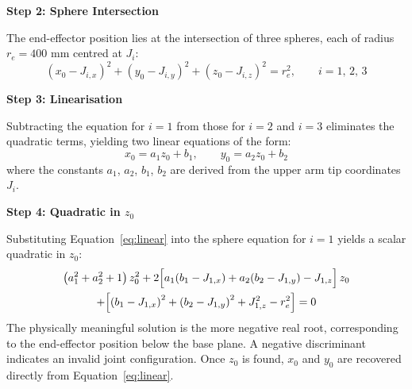 \par\noindent\textbf{Step 2: Sphere Intersection}\par
\hspace{1.27cm}
The end-effector position lies at the intersection of three spheres, each of radius
$r_e = 400$ mm centred at $J_i$:
\begin{equation}
    \left(x_0 - J_{i,x}\right)^2 +
    \left(y_0 - J_{i,y}\right)^2 +
    \left(z_0 - J_{i,z}\right)^2 = r_e^2,
    \qquad i = 1,\, 2,\, 3
    \label{eq:spheres}
\end{equation}

\par\noindent\textbf{Step 3: Linearisation}\par
\hspace{1.27cm}
Subtracting the equation for $i = 1$ from those for $i = 2$ and $i = 3$ eliminates
the quadratic terms, yielding two linear equations of the form:
\begin{equation}
    x_0 = a_1 z_0 + b_1, \qquad y_0 = a_2 z_0 + b_2
    \label{eq:linear}
\end{equation}
\hspace{1.27cm}
where the constants $a_1$, $a_2$, $b_1$, $b_2$ are derived from the upper arm tip
coordinates $J_i$.

\par\noindent\textbf{Step 4: Quadratic in $z_0$}\par
\hspace{1.27cm}
Substituting Equation~\ref{eq:linear} into the sphere equation for $i = 1$ yields
a scalar quadratic in $z_0$:
\begin{multline}
    \left(a_1^2 + a_2^2 + 1\right) z_0^2
    + 2\Bigl[a_1\!\left(b_1 - J_{1,x}\right)
             + a_2\!\left(b_2 - J_{1,y}\right)
             - J_{1,z}\Bigr]\, z_0 \\
    + \Bigl[\left(b_1 - J_{1,x}\right)^2
            + \left(b_2 - J_{1,y}\right)^2
            + J_{1,z}^2
            - r_e^2\Bigr] = 0
    \label{eq:quadratic_z}
\end{multline}
\hspace{1.27cm}
The physically meaningful solution is the more negative real root, corresponding to
the end-effector position below the base plane. A negative discriminant indicates an
invalid joint configuration. Once $z_0$ is found, $x_0$ and $y_0$ are recovered
directly from Equation~\ref{eq:linear}.


